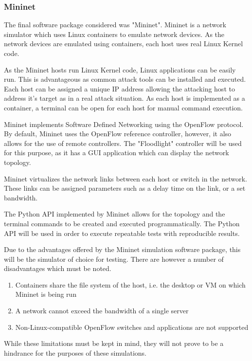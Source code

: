 \subsubsection{Mininet}

The final software package considered was "Mininet". Mininet is a network
simulator which uses Linux containers to emulate network
devices\cite{mininet_2018}. As the network devices are emulated using containers,
each host uses real Linux Kernel code.

As the Mininet hosts run Linux Kernel code, Linux applications can be easily
run. This is advantageous as common attack tools can be installed and executed.
Each host can be assigned a unique IP address allowing the attacking host to
address it's target as in a real attack situation. As each host is implemented
as a container, a terminal can be open for each host for manual command execution.

Mininet implements Software Defined Networking using the OpenFlow protocol. By
default, Mininet uses the OpenFlow reference controller, however, it also allows
for the use of remote controllers. The "Floodlight" controller will be used for
this purpose, as it has a GUI application which can display the network
topology.

Mininet virtualizes the network links between each host or switch in the
network. These links can be assigned parameters such as a delay time on the
link, or a set bandwidth.

The Python API implemented by Mininet allows for the topology and the terminal
commands to be created and executed programmatically. The Python API will be
used in order to execute repeatable tests with reproducible results.

Due to the advantages offered by the Mininet simulation software package, this
will be the simulator of choice for testing. There are however a number of
disadvantages which must be noted\cite{mnov_2018}.

\begin{enumerate}
	\item Containers share the file system of the host, i.e. the desktop or
		VM on which Mininet is being run
	\item A network cannot exceed the bandwidth of a single server
	\item Non-Linux-compatible OpenFlow switches and applications are not
		supported
\end{enumerate}

While these limitations must be kept in mind, they will not prove to be a
hindrance for the purposes of these simulations.
